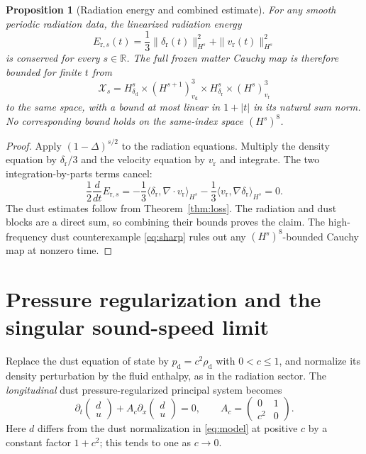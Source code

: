 \documentclass[11pt,a4paper]{article}
\newtheorem{proposition}{Proposition}
\newcommand{\R}{\mathbb R}
\begin{document}
\begin{proposition}[Radiation energy and combined estimate]
\label{prop:r-energy}
For any smooth periodic radiation data, the
linearized radiation energy
\begin{equation}\label{eq:Er}
E_{\mathrm r,s}(t)=
\frac13\|\delta_{\mathrm r}(t)\|_{H^s}^2+
\|v_{\mathrm r}(t)\|_{H^s}^2
\end{equation}
is conserved for every $s\in\R$.
The full frozen matter Cauchy map is therefore
bounded for finite $t$ from
\[
\mathcal X_s=
H^s_{\delta_{\mathrm d}}\times
(H^{s+1})^3_{v_{\mathrm d}}\times
H^s_{\delta_{\mathrm r}}\times
(H^s)^3_{v_{\mathrm r}}
\]
to the same space, with a bound at most
linear in $1+|t|$ in its natural sum norm.
No corresponding bound holds on the
same-index space $(H^s)^8$.
\end{proposition}
\begin{proof}
Apply $(1-\Delta)^{s/2}$ to the radiation
equations. Multiply the density equation by
$\delta_{\mathrm r}/3$ and the velocity
equation by $v_{\mathrm r}$ and integrate.
The two integration-by-parts terms cancel:
\[
\frac12\frac{d}{dt}E_{\mathrm r,s}
=-\frac13\langle
\delta_{\mathrm r},\nabla\cdot v_{\mathrm r}
\rangle_{H^s}
-\frac13\langle
v_{\mathrm r},\nabla\delta_{\mathrm r}
\rangle_{H^s}=0.
\]
The dust estimates follow from
Theorem~\ref{thm:loss}.
The radiation and dust blocks are a direct
sum, so combining their bounds proves
the claim. The high-frequency dust
counterexample \eqref{eq:sharp} rules
out any $(H^s)^8$-bounded Cauchy
map at nonzero time.
\end{proof}

\section{Pressure regularization and the singular sound-speed limit}
Replace the dust equation of state by
$p_{\mathrm d}=c^2\rho_{\mathrm d}$
with $0<c\le1$, and normalize its
density perturbation by the fluid enthalpy,
as in the radiation sector. The
\emph{longitudinal} dust pressure-regularized
principal system becomes
\begin{equation}\label{eq:ac}
\partial_t
\begin{pmatrix}d\\u\end{pmatrix}
+
A_c\partial_x
\begin{pmatrix}d\\u\end{pmatrix}=0,\qquad
A_c=\begin{pmatrix}0&1\\c^2&0\end{pmatrix}.
\end{equation}
Here $d$ differs from the dust normalization
in \eqref{eq:model} at positive $c$
by a constant factor $1+c^2$;
this tends to one as $c\to0$.
\end{document}
